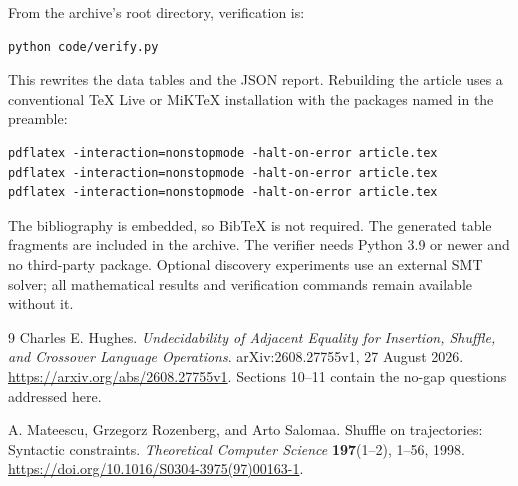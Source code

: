 \documentclass[11pt,letterpaper]{article}
\theoremstyle{definition}\newtheorem{definition}[theorem]{Definition}
\theoremstyle{remark}\newtheorem{remark}[theorem]{Remark}
\theoremstyle{definition}\newtheorem{question}[theorem]{Question}
\begin{document}
From the archive's root directory, verification is:
\begin{lstlisting}
python code/verify.py
\end{lstlisting}
This rewrites the data tables and the JSON report. Rebuilding the article uses a conventional TeX Live or MiKTeX installation with the packages named in the preamble:
\begin{lstlisting}
pdflatex -interaction=nonstopmode -halt-on-error article.tex
pdflatex -interaction=nonstopmode -halt-on-error article.tex
pdflatex -interaction=nonstopmode -halt-on-error article.tex
\end{lstlisting}
The bibliography is embedded, so BibTeX is not required. The generated table fragments are included in the archive. The verifier needs Python 3.9 or newer and no third-party package. Optional discovery experiments use an external SMT solver; all mathematical results and verification commands remain available without it.

\begin{thebibliography}{9}
Charles E. Hughes.
\emph{Undecidability of Adjacent Equality for Insertion, Shuffle, and Crossover Language Operations}.
arXiv:2608.27755v1, 27 August 2026.
\url{https://arxiv.org/abs/2608.27755v1}.
Sections 10--11 contain the no-gap questions addressed here.

A. Mateescu, Grzegorz Rozenberg, and Arto Salomaa.
Shuffle on trajectories: Syntactic constraints.
\emph{Theoretical Computer Science} \textbf{197}(1--2), 1--56, 1998.
\url{https://doi.org/10.1016/S0304-3975(97)00163-1}.
\end{thebibliography}
\end{document}
